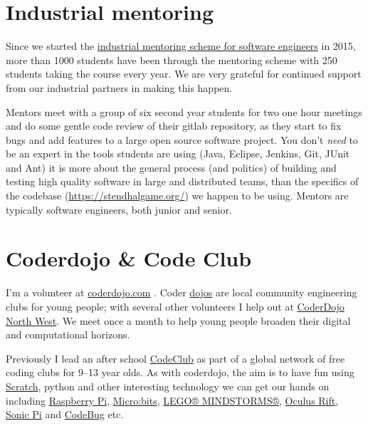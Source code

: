 \documentclass[
  12pt,
]{book}
\begin{document}
\hypertarget{industrial-mentoring}{%
\section{Industrial mentoring}\label{industrial-mentoring}}

Since we started the \href{https://www.cs.manchester.ac.uk/connect/business-engagement/industrial-mentoring/}{industrial mentoring scheme for software engineers} in 2015, more than 1000 students have been through the mentoring scheme with 250 students taking the course every year. We are very grateful for continued support from our industrial partners in making this happen.

Mentors meet with a group of six second year students for two one hour meetings and do some gentle code review of their gitlab repository, as they start to fix bugs and add features to a large open source software project. You don't \emph{need} to be an expert in the tools students are using (Java, Eclipse, Jenkins, Git, JUnit and Ant) it is more about the general process (and politics) of building and testing high quality software in large and distributed teams, than the specifics of the codebase (\url{https://stendhalgame.org/}) we happen to be using. Mentors are typically software engineers, both junior and senior.

\hypertarget{codeclub}{%
\section{Coderdojo \& Code Club}\label{codeclub}}

I'm a volunteer at \href{https://coderdojo.com/}{coderdojo.com} \citep{coderdojo}. Coder \href{https://en.wikipedia.org/wiki/Dojo}{dojos} are local community engineering clubs for young people; with several other volunteers I help out at \href{https://twitter.com/coderdojonw}{CoderDojo North West}. We meet once a month to help young people broaden their digital and computational horizons.

Previously I lead an after school \href{https://codeclub.org}{CodeClub} as part of a global network of free coding clubs for 9--13 year olds. \citep{codeclub} As with coderdojo, the aim is to have fun using \href{https://scratch.mit.edu/}{Scratch}, \citep{Resnick2009} python and other interesting technology we can get our hands on including \href{https://www.raspberrypi.org/}{Raspberry Pi}, \citep{raspberrypi} \href{https://microbit.org/}{Micro:bits}, \citep{Sentance2017} \href{https://www.lego.com/en-gb/themes/mindstorms}{LEGO® MINDSTORMS®}, \citep{Papert1980, Klassner2003} \href{https://www.oculus.com}{Oculus Rift}, \href{https://sonic-pi.net/}{Sonic Pi} \citep{Aaron2016} and \href{http://www.codebug.org.uk/}{CodeBug} etc.
\end{document}
